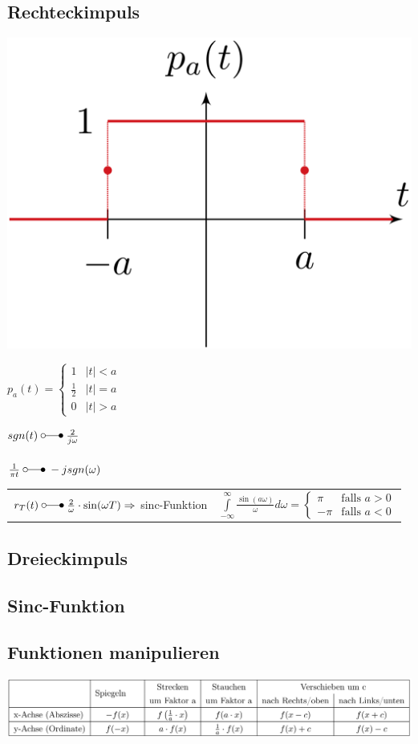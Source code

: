 	\subsection{Rechteckimpuls}
		\begin{minipage}{0.2\textwidth}
			\includegraphics[width=\textwidth]{./bilder/funktionen/rechteckF.png}
		\end{minipage}
		\qquad
		\begin{minipage}{0.45\textwidth}
			$p_{a}(t)=\begin{cases}
							1 & |t|<a \\ 
							\frac{1}{2} & |t|=a \\ 
							0 & |t|>a
						\end{cases}$
		\end{minipage}
		\qquad
		\begin{minipage}{0.25\textwidth}						
			$sgn(t) \; \laplace \; \frac{2}{j\omega}$\\
			\\
			$\frac{1}{\pi t} \; \laplace \; -j sgn(\omega)$\\
		\end{minipage}
			\begin{tabular}{p{9cm} p{9cm}}
				$r_T(t) \; \laplace \; \frac{2}{\omega} \cdot \sin(\omega T) \Rightarrow$ sinc-Funktion &
				$\int\limits_{-\infty}^{\infty} \frac{\sin(a \omega)}{\omega} d\omega = 
				\begin{cases} \pi & \text{falls }a > 0 \\ -\pi & \text{falls }a < 0 \end{cases}$
			\end{tabular}
		
	\subsection{Dreieckimpuls}
	
	\subsection{Sinc-Funktion}
	
	\subsection{Funktionen manipulieren}
		\includegraphics[width=\textwidth]{./bilder/SignalManip.png}